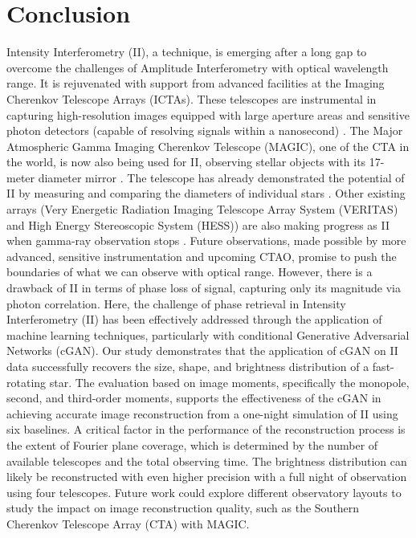 \section{Conclusion}
Intensity Interferometry (II), a technique, is emerging after a long gap to overcome the challenges of Amplitude Interferometry with optical wavelength range. It is rejuvenated with support from advanced facilities at the Imaging Cherenkov Telescope Arrays (ICTAs). These telescopes are instrumental in capturing high-resolution images equipped with large aperture areas and sensitive photon detectors (capable of resolving signals within a nanosecond) \citep{dravins2013optical}. The Major Atmospheric Gamma Imaging Cherenkov Telescope (MAGIC), one of the CTA in the world, is now also being used for II, observing stellar objects with its 17-meter diameter mirror \citep{lorenz2004status}. The telescope has already demonstrated the potential of II by measuring and comparing the diameters of individual stars \citep{abe2024performance}. Other existing arrays (Very Energetic Radiation Imaging Telescope Array System (VERITAS) and High Energy Stereoscopic System (HESS)) are also making progress as II when gamma-ray observation stops \citep{kieda2021veritas, zmija2022optical}. Future observations, made possible by more advanced, sensitive instrumentation and upcoming CTAO, promise to push the boundaries of what we can observe with optical range. However, there is a drawback of II in terms of phase loss of signal, capturing only its magnitude via photon correlation. Here, the challenge of phase retrieval in Intensity Interferometry (II) has been effectively addressed through the application of machine learning techniques, particularly with conditional Generative Adversarial Networks (cGAN). Our study demonstrates that the application of cGAN on II data successfully recovers the size, shape, and brightness distribution of a fast-rotating star. The evaluation based on image moments, specifically the monopole, second, and third-order moments, supports the effectiveness of the cGAN in achieving accurate image reconstruction from a one-night simulation of II using six baselines. A critical factor in the performance of the reconstruction process is the extent of Fourier plane coverage, which is determined by the number of available telescopes and the total observing time. The brightness distribution can likely be reconstructed with even higher precision with a full night of observation using four telescopes. Future work could explore different observatory layouts to study the impact on image reconstruction quality, such as the Southern Cherenkov Telescope Array (CTA) with MAGIC.

